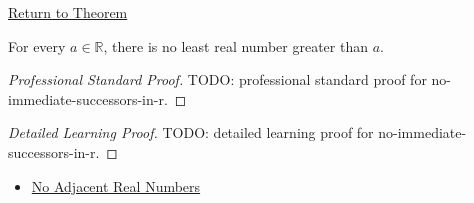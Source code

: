\newpage
{}
\label{prf:no-immediate-successors-in-r}

\begin{remark*}[Return]
\hyperref[thm:no-immediate-successors-in-r]{Return to Theorem}
\end{remark*}

\begin{theorem*}
For every $a\in\mathbb{R}$, there is no least real number greater than $a$.
\end{theorem*}

\begin{proof}[Professional Standard Proof]
\LRAProofBodyStart
TODO: professional standard proof for no-immediate-successors-in-r.
\end{proof}

\begin{proof}[Detailed Learning Proof]
\LRAProofBodyStart
TODO: detailed learning proof for no-immediate-successors-in-r.
\end{proof}

\begin{remark*}
\end{remark*}

\begin{dependencies}
\begin{itemize}
  \item \hyperref[cor:no-adjacent-real-numbers]{No Adjacent Real Numbers}
\end{itemize}
\end{dependencies}

\clearpage
